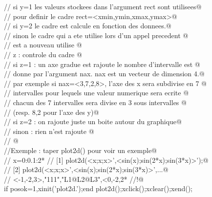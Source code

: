 \verb@//        si y=1 les valeurs stockees dans l'argument rect sont utilisees@ \\
\verb@//           pour definir le cadre  rect=<xmin,ymin,xmax,ymax>@ \\
\verb@//        si y=2 le cadre est calcule en fonction des donnees.@ \\
\verb@//        sinon le cadre qui a ete utilise lors d'un appel precedent @ \\
\verb@//           est a nouveau utilise @ \\
\verb@//     z : controle du cadre @ \\
\verb@//        si z=1 : un axe gradue est rajoute le nombre d'intervalle est @ \\
\verb@//        donne par l'argument nax. nax est un vecteur de dimension 4.@ \\
\verb@//        par exemple si nax=<3,7,2,8>, l'axe des x sera subdivise en 7 @ \\
\verb@//        intervalles pour lequels une valeur numerique sera ecrite @ \\
\verb@//        chacun des 7 intervalles sera divise en 3 sous intervalles @ \\
\verb@//        (resp. 8,2 pour l'axe des y)@ \\
\verb@//        si z=2 : on rajoute juste un boite autour du graphique@ \\
\verb@//        sinon  : rien n'est rajoute @ \\
\verb@// @ \\
\verb@//Exemple : taper plot2d() pour voir un exemple@ \\
\verb@//          x=0:0.1:2*%pi;@ \\
\verb@//  [1]    plot2d(<x;x;x>',<sin(x);sin(2*x);sin(3*x)>');@ \\
\verb@//  [2]    plot2d(<x;x;x>',<sin(x);sin(2*x);sin(3*x)>',...@ \\
\verb@//           <-1,-2,3>,"111","L1@L2@L3",<0,-2,2*%
\verb@//!@ \\
if posok=1,xinit('plot2d.');end
plot2d();xclick();xclear();xend();

